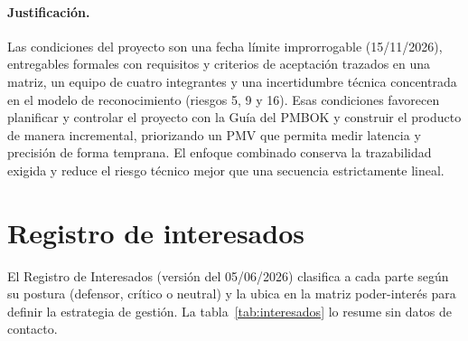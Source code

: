 \paragraph{Justificación.} Las condiciones del proyecto son una fecha límite improrrogable (15/11/2026), entregables formales con requisitos y criterios de aceptación trazados en una matriz, un equipo de cuatro integrantes y una incertidumbre técnica concentrada en el modelo de reconocimiento (riesgos 5, 9 y 16). Esas condiciones favorecen planificar y controlar el proyecto con la Guía del PMBOK y construir el producto de manera incremental, priorizando un PMV que permita medir latencia y precisión de forma temprana. El enfoque combinado conserva la trazabilidad exigida y reduce el riesgo técnico mejor que una secuencia estrictamente lineal.


\section{Registro de interesados}

El Registro de Interesados (versión del 05/06/2026) clasifica a cada parte según su postura (defensor, crítico o neutral) y la ubica en la matriz poder-interés para definir la estrategia de gestión. La tabla~\ref{tab:interesados} lo resume sin datos de contacto.

